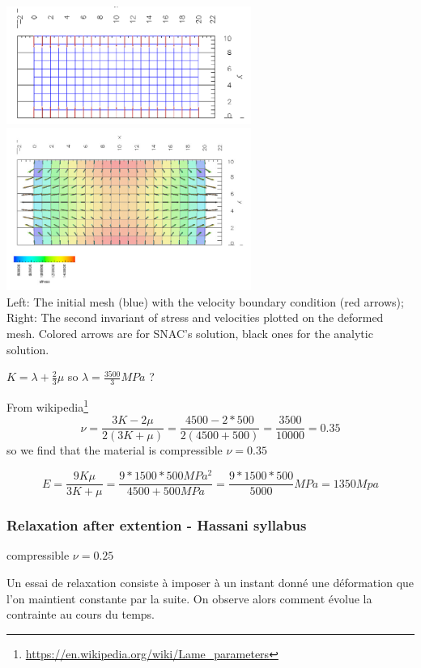 \begin{center}
\includegraphics[width=8cm]{images/viscoelasticity/snac_5}
\includegraphics[width=8cm]{images/viscoelasticity/snac_6}\\
{\captionfont 
Left: The initial mesh (blue) with the velocity boundary condition (red arrows);
Right: The second invariant of stress and velocities plotted on the deformed mesh. Colored arrows are
for SNAC’s solution, black ones for the analytic solution.}
\end{center}

$K=\lambda + \frac23 \mu$ so $\lambda=\frac{3500}{3}MPa$ ?

From wikipedia\footnote{\url{https://en.wikipedia.org/wiki/Lame_parameters}}
\[
\nu = \frac{3K-2\mu}{2(3K+\mu)} 
= \frac{4500-2*500}{2(4500+500)}
= \frac{3500}{10000}
= 0.35
\]
so we find that the material is {\color{orange} compressible $\nu=0.35$}

\[
E=\frac{9K\mu}{3K+\mu} 
=\frac{9*1500*500 MPa^2}{4500+500 MPa}
=\frac{9*1500*500}{5000} MPa
= 1350Mpa
\]


\subsubsection{Relaxation after extention - Hassani syllabus}


{\color{orange} compressible $\nu=0.25$}

Un essai de relaxation consiste à imposer à un instant donné une déformation que 
l’on maintient constante par la suite. On observe alors comment évolue la contrainte au cours du temps.

